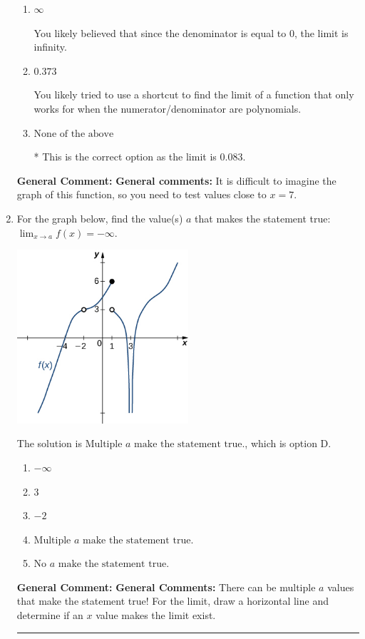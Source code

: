 \documentclass{extbook}[14pt]
\newcommand{\litem}[1]{\item #1

\rule{\textwidth}{0.4pt}}
\begin{document}
\begin{enumerate}
{\begin{enumerate}[label=\Alph*.]
You likely memorized how to solve the similar homework problem and used the same formula here.
\item \( \infty \)

You likely believed that since the denominator is equal to 0, the limit is infinity.
\item \( 0.373 \)

You likely tried to use a shortcut to find the limit of a function that only works for when the numerator/denominator are polynomials.
\item \( \text{None of the above} \)

* This is the correct option as the limit is 0.083.
\end{enumerate}

\textbf{General Comment:} \textbf{General comments:} It is difficult to imagine the graph of this function, so you need to test values close to $x = 7$.
}
\litem{
For the graph below, find the value(s) $a$ that makes the statement true: $ \displaystyle \lim_{x \rightarrow a} f(x) = -\infty$.

\begin{center}
    \includegraphics[width=0.5\textwidth]{../Figures/evaluateLimitGraphicallyC.png}
\end{center}


The solution is \( \text{Multiple } a \text{ make the statement true}. \), which is option D.\begin{enumerate}[label=\Alph*.]
\item \( -\infty \)


\item \( 3 \)


\item \( -2 \)


\item \( \text{Multiple } a \text{ make the statement true}. \)


\item \( \text{No } a \text{ make the statement true}. \)


\end{enumerate}

\textbf{General Comment:} \textbf{General Comments:} There can be multiple $a$ values that make the statement true! For the limit, draw a horizontal line and determine if an $x$ value makes the limit exist.
}
\end{enumerate}
\end{document}
